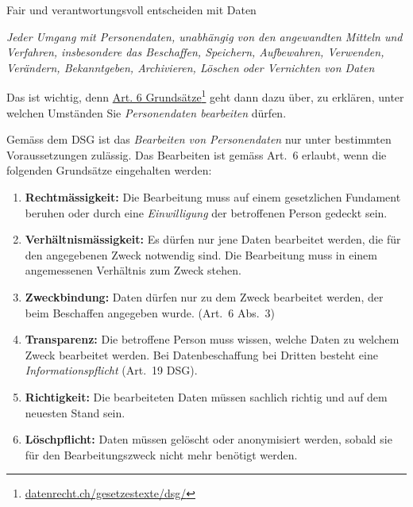 \begin{lpu}{Fair und verantwortungsvoll entscheiden mit Daten}
\begin{theorie}
    \textit{Jeder Umgang mit Personendaten, unabhängig von den angewandten Mitteln und Verfahren, insbesondere das Beschaffen, Speichern, Aufbewahren, Verwenden, Verändern, Bekanntgeben, Archivieren, Löschen oder Vernichten von Daten}
\end{theorie}

Das ist wichtig, denn \href{https://datenrecht.ch/gesetzestexte/dsg/#id686591b1ad7a0}{Art. 6 Grundsätze}\footnote{\href{https://datenrecht.ch/gesetzestexte/dsg/#id686591b1ad7a0}{\url{datenrecht.ch/gesetzestexte/dsg/}}} geht dann dazu über, zu erklären, unter welchen Umständen Sie \textit{Personendaten bearbeiten} dürfen.

\begin{theorie}
Gemäss dem DSG ist das \emph{Bearbeiten von Personendaten} nur unter bestimmten Voraussetzungen zulässig. Das Bearbeiten ist gemäss Art.\ 6 erlaubt, wenn die folgenden Grundsätze eingehalten werden:

\begin{enumerate}
  \item \textbf{Rechtmässigkeit:} Die Bearbeitung muss auf einem gesetzlichen Fundament beruhen oder durch eine \emph{Einwilligung} der betroffenen Person gedeckt sein.
  
  \item \textbf{Verhältnismässigkeit:} Es dürfen nur jene Daten bearbeitet werden, die für den angegebenen Zweck notwendig sind. Die Bearbeitung muss in einem angemessenen Verhältnis zum Zweck stehen.

  \item \textbf{Zweckbindung:} Daten dürfen nur zu dem Zweck bearbeitet werden, der beim Beschaffen angegeben wurde. (Art.\ 6 Abs.\ 3)
  
  \item \textbf{Transparenz:} Die betroffene Person muss wissen, welche Daten zu welchem Zweck bearbeitet werden. Bei Datenbeschaffung bei Dritten besteht eine \emph{Informationspflicht} (Art.\ 19 DSG).

  \item \textbf{Richtigkeit:} Die bearbeiteten Daten müssen sachlich richtig und auf dem neuesten Stand sein.

  \item \textbf{Löschpflicht:} Daten müssen gelöscht oder anonymisiert werden, sobald sie für den Bearbeitungszweck nicht mehr benötigt werden.
\end{enumerate}
\end{theorie}


\end{lpu}
